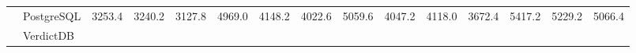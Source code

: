 \begin{table}[]
\begin{tabular}{ll|lllllllllllll}
                     & PostgreSQL & 3253.4                  & 3240.2                  & 3127.8                  & 4969.0                  & 4148.2                  & 4022.6                  & 5059.6                  & 4047.2                  & 4118.0                  & 3672.4                  & 5417.2                  & 5229.2                  & 5066.4                  \\
                     & VerdictDB  &                         &                         &                         &                         &                         &                         &                         &                         &                         &                         &                         &                         &                        
\end{tabular}
\end{table}
